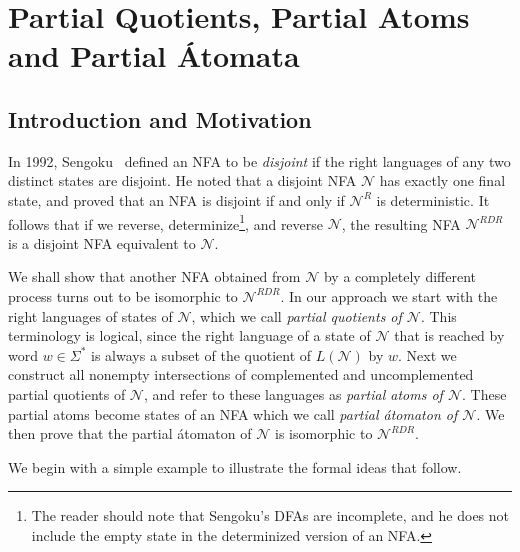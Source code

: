 \documentclass[preprint,12pt]{elsarticle}
\newcommand{\Sig}{\Sigma}
\newcommand{\cN}{{\mathcal N}}
\begin{document}
\section{Partial Quotients, Partial Atoms and Partial \'Atomata}
\label{sec:partial}
\subsection{Introduction and Motivation}
In 1992, Sengoku~\cite{Sen92} defined an NFA to be \emph{disjoint} if the right languages of any two distinct states are disjoint. He noted that a disjoint NFA $\cN$ has exactly one final state, and proved that an NFA is disjoint if and only if $\cN^R$ is deterministic. It follows that if we reverse, determinize\footnote{The reader should note that Sengoku's DFAs are incomplete, and he does not include the empty
state in the  determinized version of an NFA.}, and reverse $\cN$, the resulting NFA $\cN^{RDR}$ is a disjoint NFA equivalent to $\cN$. 

We shall show that another NFA obtained from $\cN$ by a completely different process turns out to be isomorphic to $\cN^{RDR}$. In our approach we start with the right languages of states of $\cN$, which we call \emph{partial quotients of $\cN$}. This terminology is logical, since the right language of a state of $\cN$ that is reached by word $w\in\Sig^*$ is always a subset of the quotient of $L(\cN)$ by $w$. Next we construct all nonempty intersections of complemented and uncomplemented partial quotients of $\cN$, and refer to these languages as 
\emph{partial atoms of $\cN$}. These partial atoms become states of an NFA which we call 
\emph{partial \'atomaton of $\cN$}. We then prove that the partial \'atomaton of $\cN$ is isomorphic to $\cN^{RDR}$.

We begin with a simple example to illustrate the formal ideas that follow.
\end{document}
